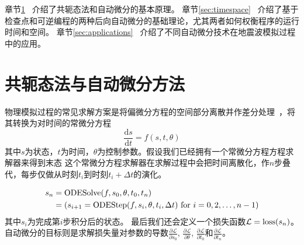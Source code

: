 \documentclass[A4,twoside,fontset=ubuntu,UTF8]{ctexart}
\def\D{\mathrm{d}}
\begin{document}

章节\ref{sec:forwardbackward}~ 介绍了共轭态法和自动微分的基本原理。
章节\ref{sec:timespace}~ 介绍了基于检查点和可逆编程的两种后向自动微分的基础理论，尤其两者如何权衡程序的运行时间和空间。
章节\ref{sec:applications}~ 介绍了不同自动微分技术在地震波模拟过程中的应用。

\section{共轭态法与自动微分方法}\label{sec:forwardbackward}

    物理模拟过程的常见求解方案是将偏微分方程的空间部分离散并作差分处理~\cite{Grote2010}，将其转换为对时间的常微分方程
    $$\frac{\D s}{\D t} = f(s, t, \theta)$$
其中$s$为状态，$t$为时间，$\theta$为控制参数。假设我们已经拥有一个常微分方程方程求解器来得到末态
这个常微分方程求解器在求解过程中会把时间离散化，作$n$步叠代，每步仅做从时刻$t_i$到时刻$t_{i}+\Delta t$的演化。

\begin{align}
    \begin{split}
    s_n &= \text{ODESolve}(f, s_0, \theta, t_0, t_n)\\
        &= (s_{i+1} = {\rm ODEStep}(f, s_{i}, \theta, t_i, \Delta t) ~\text{for $i=0,2, \ldots, n-1$})
    \end{split}
\end{align}
其中$s_i$为完成第$i$步积分后的状态。
最后我们还会定义一个损失函数$\mathcal{L} = {\rm loss}(s_n)$。
    自动微分的目标则是求解损失量对参数的导数$\frac{\partial \mathcal{L}}{\partial s_0}$, $\frac{\partial \mathcal{L}}{\partial \theta}$, $\frac{\partial \mathcal{L}}{\partial t_0}$和$\frac{\partial \mathcal{L}}{\partial t_n}$。
\end{document}

